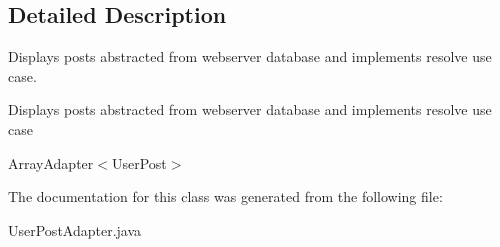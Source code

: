 \subsection{Detailed Description}
Displays posts abstracted from webserver database and implements resolve use case. 

Displays posts abstracted from webserver database and implements resolve use case

Array\+Adapter$<$\+User\+Post$>$ 

The documentation for this class was generated from the following file\+:\begin{DoxyCompactItemize}
\item 
User\+Post\+Adapter.\+java\end{DoxyCompactItemize}
